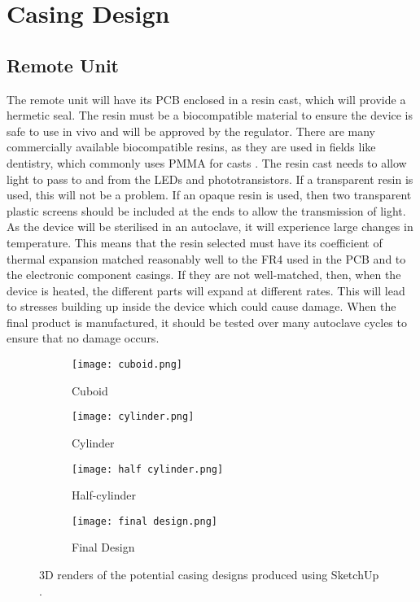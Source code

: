 \section{Casing Design}

\subsection{Remote Unit}
The remote unit will have its PCB enclosed in a resin cast, which will provide a hermetic seal. The resin must be a biocompatible material to ensure the device is safe to use in vivo and will be approved by the regulator. There are many commercially available biocompatible resins, as they are used in fields like dentistry, which commonly uses PMMA for casts \cite{biocompatible_resin}. The resin cast needs to allow light to pass to and from the LEDs and phototransistors. If a transparent resin is used, this will not be a problem. If an opaque resin is used, then two transparent plastic screens should be included at the ends to allow the transmission of light.\\

As the device will be sterilised in an autoclave, it will experience large changes in temperature. This means that the resin selected must have its coefficient of thermal expansion matched reasonably well to the FR4 used in the PCB and to the electronic component casings. If they are not well-matched, then, when the device is heated, the different parts will expand at different rates. This will lead to stresses building up inside the device which could cause damage. When the final product is manufactured, it should be tested over many autoclave cycles to ensure that no damage occurs.\\

\begin{figure}[htb]
	\centering
	\begin{subfigure}[b]{0.4\linewidth}
		\texttt{[image: cuboid.png]}
		\caption{Cuboid}
		\label{fig: cuboid}
	\end{subfigure}
	\begin{subfigure}[b]{0.4\linewidth}
		\texttt{[image: cylinder.png]}
		\caption{Cylinder}
		\label{fig: cylinder}
	\end{subfigure}
	\begin{subfigure}[b]{0.4\linewidth}
		\texttt{[image: half cylinder.png]}
		\caption{Half-cylinder}
		\label{fig: half-cylinder}
	\end{subfigure}
	\begin{subfigure}[b]{0.4\linewidth}
		\texttt{[image: final design.png]}
		\caption{Final Design}
		\label{fig: final design}
	\end{subfigure}
	\caption{3D renders of the potential casing designs produced using SketchUp \cite{sketchup}.}
	\label{fig: casings}
\end{figure}

